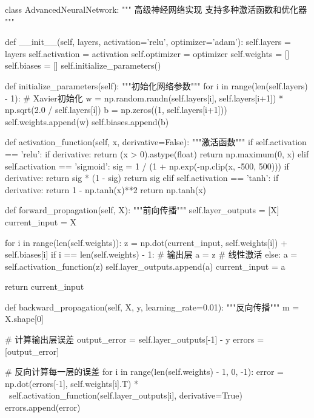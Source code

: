 \begin{longcode}[python]
class AdvancedNeuralNetwork:
    """
    高级神经网络实现
    支持多种激活函数和优化器
    """
    
    def __init__(self, layers, activation='relu', optimizer='adam'):
        self.layers = layers
        self.activation = activation
        self.optimizer = optimizer
        self.weights = []
        self.biases = []
        self.initialize_parameters()
        
    def initialize_parameters(self):
        """初始化网络参数"""
        for i in range(len(self.layers) - 1):
            # Xavier初始化
            w = np.random.randn(self.layers[i], self.layers[i+1]) * np.sqrt(2.0 / self.layers[i])
            b = np.zeros((1, self.layers[i+1]))
            self.weights.append(w)
            self.biases.append(b)
    
    def activation_function(self, x, derivative=False):
        """激活函数"""
        if self.activation == 'relu':
            if derivative:
                return (x > 0).astype(float)
            return np.maximum(0, x)
        elif self.activation == 'sigmoid':
            sig = 1 / (1 + np.exp(-np.clip(x, -500, 500)))
            if derivative:
                return sig * (1 - sig)
            return sig
        elif self.activation == 'tanh':
            if derivative:
                return 1 - np.tanh(x)**2
            return np.tanh(x)
    
    def forward_propagation(self, X):
        """前向传播"""
        self.layer_outputs = [X]
        current_input = X
        
        for i in range(len(self.weights)):
            z = np.dot(current_input, self.weights[i]) + self.biases[i]
            if i == len(self.weights) - 1:  # 输出层
                a = z  # 线性激活
            else:
                a = self.activation_function(z)
            self.layer_outputs.append(a)
            current_input = a
        
        return current_input
    
    def backward_propagation(self, X, y, learning_rate=0.01):
        """反向传播"""
        m = X.shape[0]
        
        # 计算输出层误差
        output_error = self.layer_outputs[-1] - y
        errors = [output_error]
        
        # 反向计算每一层的误差
        for i in range(len(self.weights) - 1, 0, -1):
            error = np.dot(errors[-1], self.weights[i].T) * \
                   self.activation_function(self.layer_outputs[i], derivative=True)
            errors.append(error)
        

\end{longcode}
